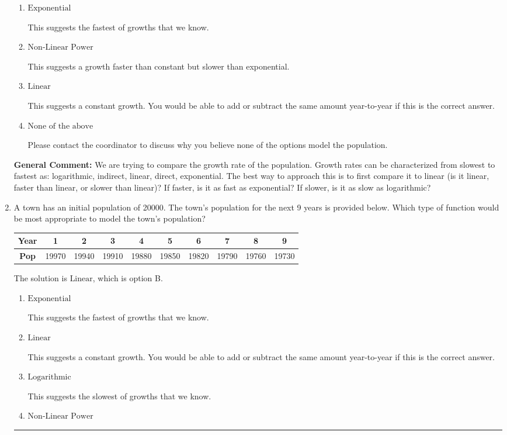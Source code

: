 \documentclass{extbook}[14pt]
\newcommand{\litem}[1]{\item #1

\rule{\textwidth}{0.4pt}}
\begin{document}
\begin{enumerate}
{\begin{enumerate}[label=\Alph*.]
This suggests the slowest of growths that we know.
\item \( \text{Exponential} \)

This suggests the fastest of growths that we know.
\item \( \text{Non-Linear Power} \)

This suggests a growth faster than constant but slower than exponential.
\item \( \text{Linear} \)

This suggests a constant growth. You would be able to add or subtract the same amount year-to-year if this is the correct answer.
\item \( \text{None of the above} \)

Please contact the coordinator to discuss why you believe none of the options model the population.
\end{enumerate}

\textbf{General Comment:} We are trying to compare the growth rate of the population. Growth rates can be characterized from slowest to fastest as: logarithmic, indirect, linear, direct, exponential. The best way to approach this is to first compare it to linear (is it linear, faster than linear, or slower than linear)? If faster, is it as fast as exponential? If slower, is it as slow as logarithmic?
}
\litem{
A town has an initial population of 20000. The town's population for the next 9 years is provided below. Which type of function would be most appropriate to model the town's population?


\begin{tabular}{c|c|c|c|c|c|c|c|c|c}
\textbf{Year} &1 &2 &3 &4 &5 &6 &7 &8 &9\tabularnewline \hline
\textbf{Pop} &19970 &19940 &19910 &19880 &19850 &19820 &19790 &19760 &19730\end{tabular}The solution is \( \text{Linear} \), which is option B.\begin{enumerate}[label=\Alph*.]
\item \( \text{Exponential} \)

This suggests the fastest of growths that we know.
\item \( \text{Linear} \)

This suggests a constant growth. You would be able to add or subtract the same amount year-to-year if this is the correct answer.
\item \( \text{Logarithmic} \)

This suggests the slowest of growths that we know.
\item \( \text{Non-Linear Power} \)


\end{enumerate}}
\end{enumerate}
\end{document}

